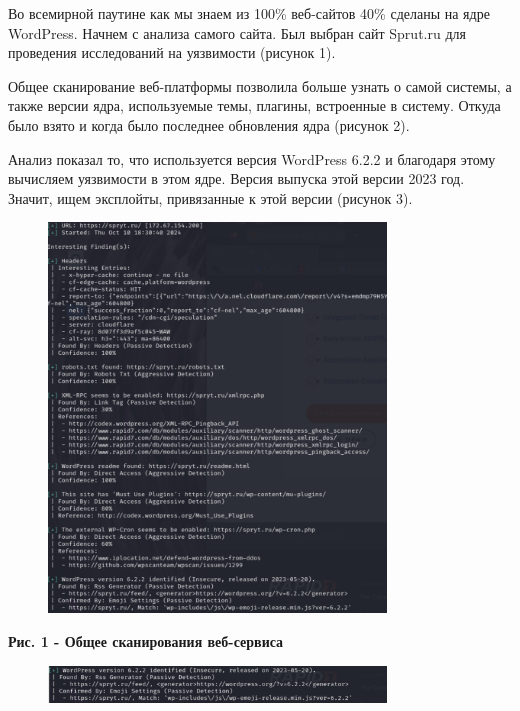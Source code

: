Во всемирной паутине как мы знаем из 100\% веб-сайтов 40\% сделаны на
ядре WordPress. Начнем с анализа самого сайта. Был выбран сайт Sprut.ru
для проведения исследований на уязвимости (рисунок 1).

Общее сканирование веб-платформы позволила больше узнать о самой
системы, а также версии ядра, используемые темы, плагины, встроенные в
систему. Откуда было взято и когда было последнее обновления ядра
(рисунок 2).

Анализ показал то, что используется версия WordPress 6.2.2 и благодаря
этому вычисляем уязвимости в этом ядре. Версия выпуска этой версии 2023
год. Значит, ищем эксплойты, привязанные к этой версии (рисунок 3).

\begin{figure}[H]
	\centering
	\includegraphics[width=0.8\textwidth]{media/ict/image34}
	\caption*{}
\end{figure}


{\bfseries Рис. 1 - Общее сканирования веб-сервиса}

\begin{figure}[H]
	\centering
	\includegraphics[width=0.8\textwidth]{media/ict/image35}
	\caption*{}
\end{figure}


